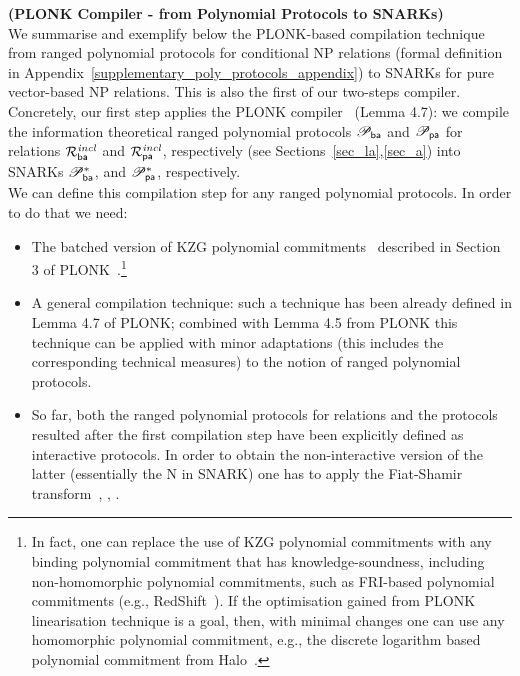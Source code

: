 \noindent \textbf{(PLONK Compiler - from Polynomial Protocols to SNARKs)} \\

\noindent We summarise and exemplify below the PLONK-based compilation technique~\cite{plonk} from 
ranged polynomial protocols for conditional NP relations (formal definition in Appendix~\ref{supplementary_poly_protocols_appendix}) to 
SNARKs for pure vector-based NP relations. This is also the first of our two-steps compiler. Concretely, our first step applies the PLONK compiler~\cite{plonk} (Lemma 4.7): 
we compile the information theoretical ranged polynomial protocols $\mathscr{P}_{\mathsf{ba}}$ and $\mathscr{P}_{\mathsf{pa}}$ for relations $\mathcal{R}^{\mathit{incl}}_{\mathsf{ba}}$ and $\mathcal{R}^{\mathit{incl}}_{\mathsf{pa}}$, respectively (see Sections~\ref{sec_la},\ref{sec_a}) 
into SNARKs $\mathscr{P}_{\mathsf{ba}}^{\ast}$, and $\mathscr{P}_{\mathsf{pa}}^{\ast}$, respectively. \\
We can define this compilation step for any ranged polynomial protocols. In order to do that we need: 
\begin{itemize}
\item  The batched version of KZG polynomial commitments~\cite{KZG_10} described in Section 3 of PLONK~\cite{plonk}.\footnote{In fact, 
one can replace the use of KZG polynomial commitments with any binding polynomial commitment that has knowledge-soundness, including non-homomorphic polynomial commitments, 
such as FRI-based polynomial commitments (e.g., RedShift~\cite{redshift}). If the optimisation gained from PLONK linearisation technique is a goal, 
then, with minimal changes one can use any homomorphic polynomial commitment, e.g., the discrete logarithm based polynomial commitment 
from Halo~\cite{halo}.}
\item A general compilation technique: such a technique has been already defined in Lemma 4.7 of PLONK; combined with Lemma 4.5 
from PLONK this technique can be applied with minor adaptations (this includes the corresponding technical measures) to the notion of ranged 
polynomial protocols.  
\item So far, both the ranged polynomial protocols for relations and the protocols resulted after the first compilation step have been explicitly defined as interactive 
protocols. In order to obtain the non-interactive version of the latter (essentially the N in SNARK) one has to apply the Fiat-Shamir 
transform~\cite{FS_transform}, \cite{FS_transform_with_proof}, \cite{SE_plonk}.
\end{itemize}

